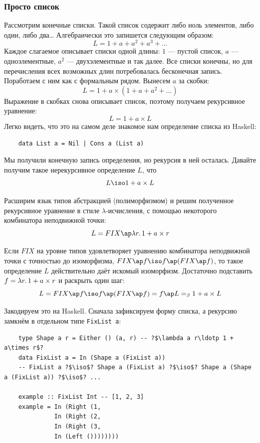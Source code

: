 \subsubsection{Просто список}

Рассмотрим конечные списки.
Такой список содержит либо ноль элементов, либо один, либо два\ldots
Алгебраически это запишется следующим образом:
\[
    L = 1 + a + a^2 + a^3 + \ldots
\]
Каждое слагаемое описывает списки одной длины: $1$ --- пустой список, $a$ --- одноэлементные, $a^2$ --- двухэлементные и так далее.
Все списки конечны, но для перечисления всех возможных длин потребовалась бесконечная запись.
Поработаем с ним как с формальным рядом.
Вынесем $a$ за скобки:
\[
    L = 1 + a \times (1 + a + a^2 + \ldots)
\]
Выражение в скобках снова описывает список, поэтому получаем рекурсивное уравнение:
\[
    L = 1 + a \times L
\]
Легко видеть, что это на самом деле знакомое нам определение списка из Haskell:
\begin{verbatim}
    data List a = Nil | Cons a (List a)
\end{verbatim}

Мы получили конечную запись определения, но рекурсия в ней осталась.
Давайте получим такое нерекурсивное определение $L$, что
\[
    L \iso 1 + a \times L
\]

Расширим язык типов абстракцией (полиморфизмом) и решим полученное рекурсивное уравнение в стиле $\lambda$-исчисления, с помощью некоторого комбинатора неподвижной точки:
\[
    L = FIX\ap\lambda r\ldotp 1 + a \times r
\]

Если $FIX$ на уровне типов удовлетворяет уравнению комбинатора неподвижной точки с точностью до изоморфизма, $FIX\ap f \iso f\ap(FIX\ap f)$, то такое определение $L$ действительно даёт искомый изоморфизм.
Достаточно подставить $f = \lambda r\ldotp 1 + a \times r$ и раскрыть один шаг:
\[
    L = FIX\ap f \iso f\ap(FIX\ap f) = f\ap L =_\beta 1 + a \times L
\]

Закодируем это на Haskell.
Сначала зафиксируем форму списка, а рекурсию замкнём в отдельном типе \texttt{FixList a}:
\begin{verbatim}
    type Shape a r = Either () (a, r) -- ?$\lambda a r\ldotp 1 + a\times r$?
    data FixList a = In (Shape a (FixList a))
    -- FixList a ?$\iso$? Shape a (FixList a) ?$\iso$? Shape a (Shape a (FixList a)) ?$\iso$? ...

    example :: FixList Int -- [1, 2, 3]
    example = In (Right (1,
              In (Right (2,
              In (Right (3,
              In (Left ())))))))
\end{verbatim}

